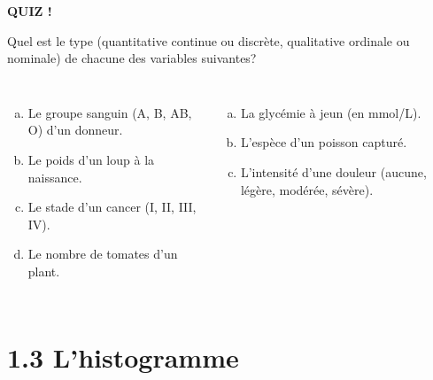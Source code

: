 \documentclass{BeamerTemplate}
\begin{document}
\begin{frame}[plain,t]
  \centerline{\LARGE\bfseries\alert{QUIZ !}}

  \medskip
  Quel est le type (quantitative continue ou discrète, qualitative ordinale
  ou nominale) de chacune des variables suivantes?

  \medskip
  \begin{columns}[T]
    \begin{enumerate}[a)]\itemsep 0.7cm
      \item Le groupe sanguin (A, B, AB, O) d'un donneur.
      \item Le poids d'un loup à la naissance.
      \item Le stade d'un cancer (I, II, III, IV).
      \item Le nombre de tomates d'un plant.
    \end{enumerate}
    \begin{enumerate}[a)]\itemsep 0.7cm
      \setcounter{enumi}{4}
      \item<2-> La glycémie à jeun (en mmol/L).
      \item<2-> L'espèce d'un poisson capturé.
      \item<2-> L'intensité d'une douleur (aucune, légère, modérée, sévère).
    \end{enumerate}
  \end{columns}
\end{frame}

\section[Histogramme]{1.3 L'histogramme}
\end{document}
